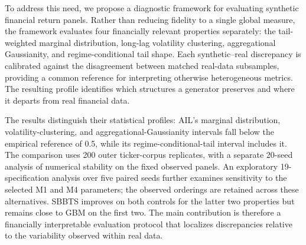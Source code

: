 To address this need, we propose a diagnostic framework for evaluating synthetic financial return panels.
Rather than reducing fidelity to a single global measure, the framework evaluates four financially relevant properties separately: the tail-weighted marginal distribution, long-lag volatility clustering, aggregational Gaussianity, and regime-conditional tail shape.
Each synthetic--real discrepancy is calibrated against the disagreement between matched real-data subsamples, providing a common reference for interpreting otherwise heterogeneous metrics.
The resulting profile identifies which structures a generator preserves and where it departs from real financial data.

{
The results distinguish their statistical profiles: AIL's marginal
distribution, volatility-clustering, and aggregational-Gaussianity
intervals fall below the empirical reference of 0.5, while its
regime-conditional-tail interval includes it.
The comparison uses 200 outer ticker-corpus replicates, with a separate
20-seed analysis of numerical stability on the fixed observed panels.
An exploratory 19-specification analysis over five paired seeds further
examines sensitivity to the selected M1 and M4 parameters; the observed
orderings are retained across these alternatives.
{\color{black}SBBTS improves on both controls for the latter two properties but remains
close to GBM on the first two.}
{\color{black}The main contribution is therefore a financially interpretable evaluation
protocol that localizes discrepancies relative to the variability observed
within real data.
}}
